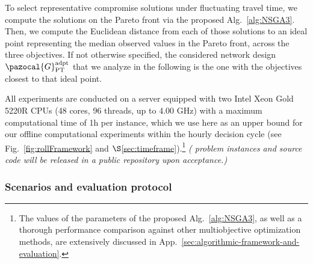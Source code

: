 \documentclass[a4paper,fleqn]{cas-sc}
\begin{document}
To select representative compromise solutions under fluctuating travel time, we compute the solutions on the Pareto front via the proposed Alg.~\ref{alg:NSGA3}. 
Then, we compute the Euclidean distance from each of those solutions to an ideal point representing the median observed values in the Pareto front, across the three objectives. If not otherwise specified, the considered network design $\pazocal{G}_{\text{PT}}^{\text{adpt}}$ that we analyze in the following is the one with the objectives closest to that ideal point. 

All experiments are conducted on a server equipped with two Intel Xeon Gold 5220R CPUs (48 cores, 96 threads, up to 4.00 GHz) with a maximum computational time of 1h per instance, which we use here as an upper bound for our offline computational experiments within the hourly decision cycle (see Fig.~\ref{fig:rollFramework} and $\S$\ref{sec:timeframe}).\footnote{The values of the parameters of the proposed Alg.~\ref{alg:NSGA3}, as well as a thorough performance comparison against other multiobjective optimization methods, are extensively discussed in App.~\ref{sec:algorithmic-framework-and-evaluation}.}
%
\textit{( problem instances and source code will be released in a public repository upon acceptance.)}




\subsubsection{Scenarios and evaluation protocol}
\end{document}
